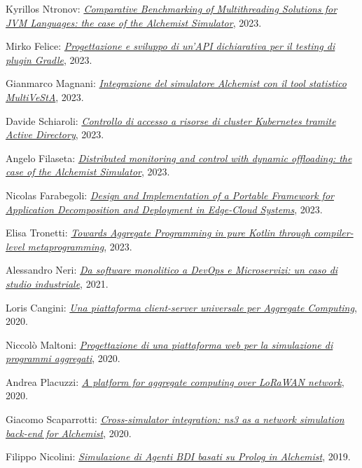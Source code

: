 \begin{innerlist}
    \item Kyrillos Ntronov: \href{https://amslaurea.unibo.it/29647/}{\textit{Comparative Benchmarking of Multithreading Solutions for JVM Languages: the case of the Alchemist Simulator}}, 2023.
    \item Mirko Felice: \href{https://amslaurea.unibo.it/29136/}{\textit{Progettazione e sviluppo di un'API dichiarativa per il testing di plugin Gradle}}, 2023.
    \item Gianmarco Magnani: \href{https://amslaurea.unibo.it/28184/}{\textit{Integrazione del simulatore Alchemist con il tool statistico MultiVeStA}}, 2023.
    \item Davide Schiaroli: \href{https://amslaurea.unibo.it/28132/}{\textit{Controllo di accesso a risorse di cluster Kubernetes tramite Active Directory}}, 2023.
    \item Angelo Filaseta: \href{https://amslaurea.unibo.it/28111/}{\textit{Distributed monitoring and control with dynamic offloading: the case of the Alchemist Simulator}}, 2023.
    \item Nicolas Farabegoli: \href{https://amslaurea.unibo.it/28035/}{\textit{Design and Implementation of a Portable Framework for Application Decomposition and Deployment in Edge-Cloud Systems}}, 2023.
    \item Elisa Tronetti: \href{https://amslaurea.unibo.it/28077/}{\textit{Towards Aggregate Programming in pure Kotlin through compiler-level metaprogramming}}, 2023.
    \item Alessandro Neri: \href{http://amslaurea.unibo.it/23043/}{\textit{Da software monolitico a DevOps e Microservizi: un caso di studio industriale}}, 2021.
    \item Loris Cangini: \href{http://amslaurea.unibo.it/20410/}{\textit{Una piattaforma client-server universale per Aggregate Computing}}, 2020.
    \item Niccolò Maltoni: \href{http://amslaurea.unibo.it/20478/}{\textit{Progettazione di una piattaforma web per la simulazione di programmi aggregati}}, 2020.
    \item Andrea Placuzzi: \href{http://amslaurea.unibo.it/20484/}{\textit{A platform for aggregate computing over LoRaWAN network}}, 2020.
    \item Giacomo Scaparrotti: \href{http://amslaurea.unibo.it/20440/}{\textit{Cross-simulator integration: ns3 as a network simulation back-end for Alchemist}}, 2020.
    \item Filippo Nicolini: \href{http://amslaurea.unibo.it/19521/}{\textit{Simulazione di Agenti BDI basati su Prolog in Alchemist}}, 2019.

\end{innerlist}
